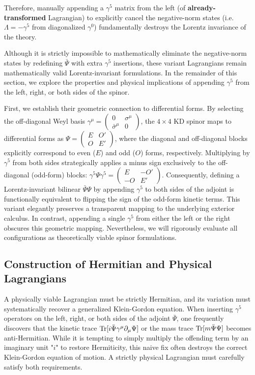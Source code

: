 Therefore, manually appending a $\gamma^5$ matrix from the left (of \textbf{already-transformed} Lagrangian) to explicitly cancel the negative-norm states (i.e. $\Lambda=-\gamma^5$ from diagonalized $\gamma^0$) fundamentally destroys the Lorentz invariance of the theory.

Although it is strictly impossible to mathematically eliminate the negative-norm states by redefining $\bar\Psi$ with extra $\gamma^5$ insertions, these variant Lagrangians remain mathematically valid Lorentz-invariant formulations. In the remainder of this section, we explore the properties and physical implications of appending $\gamma^5$ from the left, right, or both sides of the spinor. 

First, we establish their geometric connection to differential forms. By selecting the off-diagonal Weyl basis $\gamma^\mu=\begin{pmatrix}
    0& \sigma^\mu \\ \bar\sigma^\mu &0
\end{pmatrix}$, the $4\times 4$ KD spinor maps to differential forms as $\Psi=\begin{pmatrix}
    E& O' \\ O &E'
\end{pmatrix}$, where the diagonal and off-diagonal blocks explicitly correspond to even ($E$) and odd ($O$) forms, respectively. Multiplying by $\gamma^5$ from both sides strategically applies a minus sign exclusively to the off-diagonal (odd-form) blocks: $\gamma^5\Psi\gamma^5=\begin{pmatrix}
    E& -O' \\ -O &E'
\end{pmatrix}$. Consequently, defining a Lorentz-invariant bilinear $\bar{\Psi}\Psi$ by appending $\gamma^5$ to both sides of the adjoint is functionally equivalent to flipping the sign of the odd-form kinetic terms. This variant elegantly preserves a transparent mapping to the underlying exterior calculus. In contrast, appending a single $\gamma^5$ from either the left or the right obscures this geometric mapping. Nevertheless, we will rigorously evaluate all configurations as theoretically viable spinor formulations.


\subsection{Construction of Hermitian and Physical Lagrangians}

A physically viable Lagrangian must be strictly Hermitian, and its variation must systematically recover a generalized Klein-Gordon equation. When inserting $\gamma^5$ operators on the left, right, or both sides of the adjoint $\bar\Psi$, one frequently discovers that the kinetic trace ${\rm Tr}[i\bar{\Psi}\gamma^\mu\partial_\mu\Psi]$ or the mass trace ${\rm Tr}[m\bar{\Psi}\Psi]$ becomes anti-Hermitian. While it is tempting to simply multiply the offending term by an imaginary unit "$i$" to restore Hermiticity, this naive fix often destroys the correct Klein-Gordon equation of motion. A strictly physical Lagrangian must carefully satisfy both requirements.

